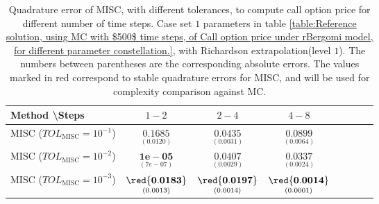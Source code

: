 \begin{table}[!h]
	\centering
	\begin{tabular}{l*{6}{c}r}
		Method \textbackslash  Steps            & $1-2$ & $2-4$ & $4-8$  \\
		\hline
		MISC ($TOL_{\text{MISC}}=10^{-1}$)  & $\underset{(  0.0120)}{\mathbf{   0.1685}}$ & $\underset{(0.0031)}{\mathbf{0.0435}}$ & $\underset{(0.0064)}{\mathbf{0.0899}}$  \\
		MISC ($TOL_{\text{MISC}}=10^{-2}$)  & $\underset{(7e-07)}{\mathbf{1e-05}}$ &    $\underset{(0.0029)}{\mathbf{0.0407}}$ & $\underset{(0.0024  )}{\mathbf{0.0337}}$  \\
		MISC ($TOL_{\text{MISC}}=10^{-3}$)  & $\underset{(0.0013)}{\mathbf{
				\red{0.0183}}}$ &    $\underset{(0.0014
			)}{\mathbf{\red{0.0197}}}$ & $\underset{(0.0001)}{\mathbf{ \red{0.0014}
		}}$   \\
		
%			
		\hline
	\end{tabular}
	\caption{Quadrature error of MISC, with different tolerances,  to compute call option price  for different number of time steps. Case set $1$ parameters in table \ref{table:Reference solution, using MC with $500$ time steps, of Call option price under rBergomi model, for different parameter constellation.}, with Richardson extrapolation(level $1$). The numbers between parentheses are the corresponding absolute errors. The values marked in red correspond to stable quadrature errors for MISC, and will be used for complexity comparison against MC.}
	\label{Quadrature error of MISC to compute Call option price of the different tolerances for different number of time steps. Case set $1$ parameters, with Richardson extrapolation(level $1$). The numbers between parentheses are the corresponding absolute errors.}
\end{table}





